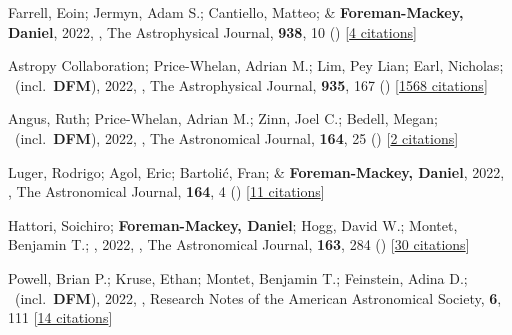 \item[{\color{numcolor}\scriptsize86}] Farrell, Eoin; Jermyn, Adam S.; Cantiello, Matteo; \& \textbf{Foreman-Mackey, Daniel}, 2022, , The Astrophysical Journal, \textbf{938}, 10 () [\href{https://ui.adsabs.harvard.edu/abs/2022ApJ...938...10F}{4 citations}]

\item[{\color{numcolor}\scriptsize85}] Astropy Collaboration; Price-Whelan, Adrian M.; Lim, Pey Lian; Earl, Nicholas; \etal\ (incl.\ \textbf{DFM}), 2022, , The Astrophysical Journal, \textbf{935}, 167 () [\href{https://ui.adsabs.harvard.edu/abs/2022ApJ...935..167A}{1568 citations}]

\item[{\color{numcolor}\scriptsize84}] Angus, Ruth; Price-Whelan, Adrian M.; Zinn, Joel C.; Bedell, Megan; \etal\ (incl.\ \textbf{DFM}), 2022, , The Astronomical Journal, \textbf{164}, 25 () [\href{https://ui.adsabs.harvard.edu/abs/2022AJ....164...25A}{2 citations}]

\item[{\color{numcolor}\scriptsize83}] Luger, Rodrigo; Agol, Eric; Bartoli{\'c}, Fran; \& \textbf{Foreman-Mackey, Daniel}, 2022, , The Astronomical Journal, \textbf{164}, 4 () [\href{https://ui.adsabs.harvard.edu/abs/2022AJ....164....4L}{11 citations}]

\item[{\color{numcolor}\scriptsize82}] Hattori, Soichiro; \textbf{Foreman-Mackey, Daniel}; Hogg, David W.; Montet, Benjamin T.; \etal, 2022, , The Astronomical Journal, \textbf{163}, 284 () [\href{https://ui.adsabs.harvard.edu/abs/2022AJ....163..284H}{30 citations}]

\item[{\color{numcolor}\scriptsize81}] Powell, Brian P.; Kruse, Ethan; Montet, Benjamin T.; Feinstein, Adina D.; \etal\ (incl.\ \textbf{DFM}), 2022, , Research Notes of the American Astronomical Society, \textbf{6}, 111 [\href{https://ui.adsabs.harvard.edu/abs/2022RNAAS...6..111P}{14 citations}]

